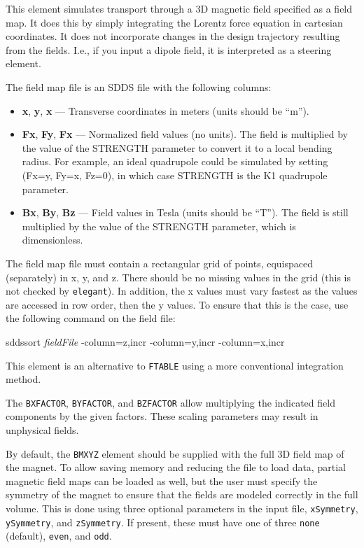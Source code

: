 This element simulates transport through a 3D magnetic field
specified as a field map.  It does this by simply integrating the
Lorentz force equation in cartesian coordinates.  It does not
incorporate changes in the design trajectory resulting from the
fields.  I.e., if you input a dipole field, it is interpreted as a
steering element.

The field map file is an SDDS file with the following columns:
\begin{itemize}
\item {\bf x}, {\bf y}, {\bf x} --- Transverse coordinates in meters (units should be ``m'').
\item {\bf Fx}, {\bf Fy}, {\bf Fx} --- Normalized field values (no units).  The
        field is multiplied by the value of the STRENGTH parameter to convert it to a 
        local bending radius.  For example, an ideal quadrupole could be simulated
        by setting (Fx=y, Fy=x, Fz=0), in which case STRENGTH is the
        K1 quadrupole parameter.
\item {\bf Bx}, {\bf By}, {\bf Bz} --- Field values in Tesla (units should be ``T'').
        The field is still multiplied by the value of the STRENGTH parameter, which
        is dimensionless.
\end{itemize}

The field map file must contain a rectangular grid of points,
equispaced (separately) in x, y, and z.  There should be no missing values
in the grid (this is not checked by {\tt elegant}).  In addition, the
x values must vary fastest as the values are accessed in row order, then the y values.
To ensure that this is the case, use the following command on the field
file:
\begin{flushleft}
sddssort {\em fieldFile} -column=z,incr -column=y,incr -column=x,incr
\end{flushleft}

This element is an alternative to \verb|FTABLE| using a more conventional integration method.

The \verb|BXFACTOR|, \verb|BYFACTOR|, and \verb|BZFACTOR| allow multiplying the indicated field components by the given factors.
These scaling parameters may result in unphysical fields.

By default, the \verb|BMXYZ| element should be supplied with the full 3D field map of the magnet.
To allow saving memory and reducing the file to load data, partial magnetic field maps can be 
loaded as well, but the user must specify the symmetry of the magnet to ensure that the fields are
modeled correctly in the full volume.
This is done using three optional parameters in the input file, \verb|xSymmetry|, \verb|ySymmetry|, and \verb|zSymmetry|.
If present, these must have one of three \verb|none| (default), \verb|even|, and \verb|odd|.  

